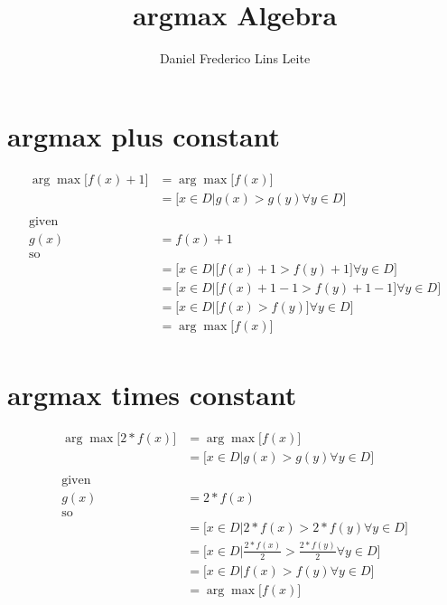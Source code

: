 \documentclass[10pt,a4paper]{article}
\title{argmax Algebra}
\author{Daniel Frederico Lins Leite}
\begin{document}
	\maketitle
	\section{argmax plus constant}
	\begin{align*}
		\arg\max {\big[f(x) + 1\big]} &= \arg\max {\big[f(x)\big]}\\
		&= \big[x \in D | g(x) > g(y) \forall y \in D]\\
		\\
		\mbox{given}\\
		g(x) &= f(x) + 1\\
		\mbox{so}\\
		&=\big[x \in D | \big[f(x) + 1 > f(y) + 1\big] \forall y \in D]\\
		&=\big[x \in D | \big[f(x) + 1 - 1 > f(y) + 1 - 1\big] \forall y \in D]\\
		&=\big[x \in D | \big[f(x) > f(y)\big] \forall y \in D]\\
		&=\arg\max {\big[f(x)\big]}\\
	\end{align*}
	\section{argmax times constant}
	\begin{align*}
		\arg\max {\big[2*f(x)\big]} &= \arg\max {\big[f(x)\big]}\\		&= \big[x \in D | g(x) > g(y) \forall y \in D]\\
		\\
		\mbox{given}\\
		g(x) &= 2*f(x)\\
		\mbox{so}\\
		&= \big[x \in D | 2*f(x) > 2*f(y) \forall y \in D]\\
		&= \big[x \in D | \frac{2*f(x)}{2} > \frac{2*f(y)}{2} \forall y \in D]\\
		&= \big[x \in D | f(x) > f(y) \forall y \in D]\\
		&=\arg\max {\big[f(x)\big]}\\
	\end{align*}
\end{document}
